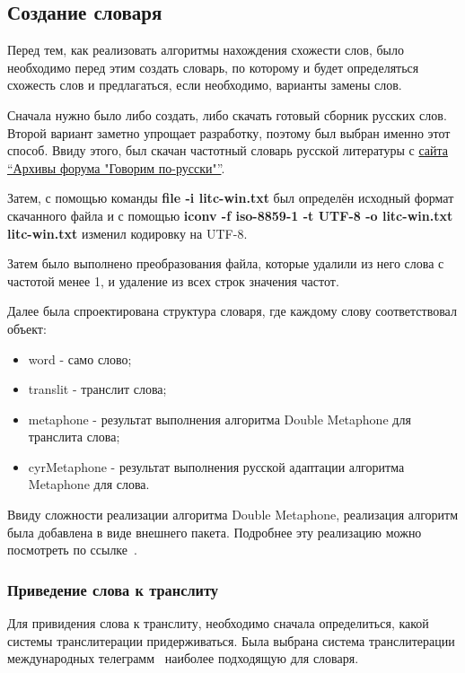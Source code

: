 \subsection{Создание словаря}

Перед тем, как реализовать алгоритмы нахождения схожести слов, было необходимо перед этим создать словарь, по которому и будет определяться схожесть слов и предлагаться, если необходимо, варианты замены слов.

Сначала нужно было либо создать, либо скачать готовый сборник русских слов. Второй вариант заметно упрощает разработку, поэтому был выбран именно этот способ. Ввиду этого, был скачан частотный словарь русской литературы с \href{http://speakrus.ru/dict/index.htm}{сайта ``Архивы форума "Говорим по-русски"''}.

Затем, с помощью команды \textbf{file -i litc-win.txt} был определён исходный формат скачанного файла и с помощью \textbf{iconv -f iso-8859-1 -t UTF-8 -o litc-win.txt litc-win.txt} изменил кодировку на UTF-8.

Затем было выполнено преобразования файла, которые удалили из него слова с частотой менее 1, и удаление из всех строк значения частот. 

Далее была спроектирована структура словаря, где каждому слову соответствовал объект:

\begin{itemize}
  \item word - само слово;
  \item translit - транслит слова;
  \item metaphone - результат выполнения алгоритма Double Metaphone для транслита слова;
  \item cyrMetaphone - результат выполнения русской адаптации алгоритма Metaphone для слова.
\end{itemize}

Ввиду сложности реализации алгоритма Double Metaphone, реализация алгоритм была добавлена в виде внешнего пакета. Подробнее эту реализацию можно посмотреть по ссылке~\cite{doubleMetaphoneNPM}.

\subsubsection{Приведение слова к транслиту}

Для привидения слова к транслиту, необходимо сначала определиться, какой системы транслитерации придерживаться. Была выбрана система транслитерации международных телеграмм~\cite{instukcia} наиболее подходящую для словаря.

